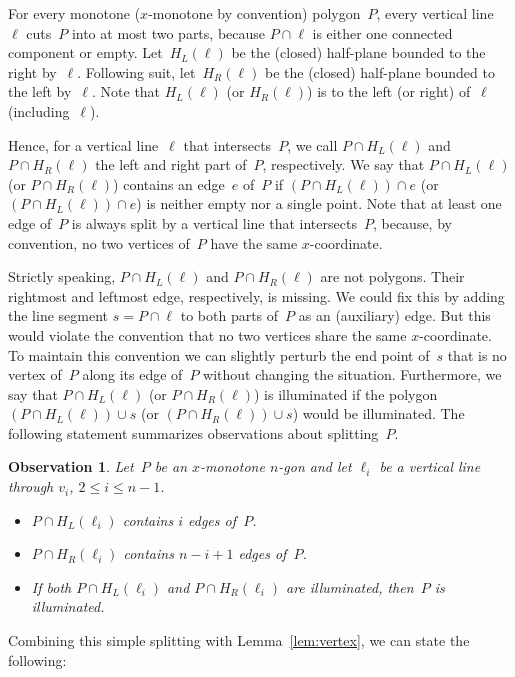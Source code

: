 \documentclass[A4]{article}
\newtheorem{observation}[theorem]{Observation}
\begin{document}
For every monotone ($x$-monotone by convention) polygon~$P$, every vertical line~$\ell$ cuts~$P$ into at most two parts, because $P\cap\ell$ is either one connected component or empty.
Let~$H_L(\ell)$ be the (closed) half-plane bounded to the right by~$\ell$.
Following suit, let~$H_R(\ell)$ be the (closed) half-plane bounded to the left by~$\ell$.
Note that $H_L(\ell)$ (or $H_R(\ell)$) is to the left (or right) of~$\ell$ (including~$\ell$).

Hence, for a vertical line~$\ell$ that intersects~$P$, we call $P\cap H_L(\ell)$ and $P\cap H_R(\ell)$ the left and right part of~$P$, respectively.
We say that $P\cap H_L(\ell)$ (or $P\cap H_R(\ell)$) contains an edge~$e$ of~$P$ if $(P\cap H_L(\ell))\cap e$ (or $(P\cap H_L(\ell))\cap e$) is neither empty nor a single point.
Note that at least one edge of~$P$ is always split by a vertical line that intersects~$P$, because, by convention, no two vertices of~$P$ have the same $x$-coordinate.

Strictly speaking, $P\cap H_L(\ell)$ and $P\cap H_R(\ell)$ are not polygons.
Their rightmost and leftmost edge, respectively, is missing.
We could fix this by adding the line segment $s=P\cap\ell$ to both parts of~$P$ as an (auxiliary) edge.
But this would violate the convention that no two vertices share the same $x$-coordinate.
To maintain this convention we can slightly perturb the end point of~$s$ that is no vertex of~$P$ along its edge of~$P$ without changing the situation.
Furthermore, we say that $P\cap H_L(\ell)$ (or $P\cap H_R(\ell)$) is illuminated if the polygon $(P\cap H_L(\ell))\cup s$ (or $(P\cap H_R(\ell))\cup s$) would be illuminated.
The following statement summarizes observations about splitting~$P$. 

\begin{observation}\label{obs:simplesplit}
Let~$P$ be an $x$-monotone $n$-gon and let $\ell_i$ be a vertical line through $v_i$, $2\leq i\leq n-1$.
\begin{itemize}\vspace*{-0.5ex}
\item $P\cap H_L(\ell_i)$ contains $i$ edges of~$P$.
\item $P\cap H_R(\ell_i)$ contains $n-i+1$ edges of~$P$.
\item If both $P\cap H_L(\ell_i)$ and $P\cap H_R(\ell_i)$ are illuminated, then~$P$ is illuminated.
\end{itemize}
\end{observation}


Combining this simple splitting with Lemma~\ref{lem:vertex}, we can state the following:
\end{document}
